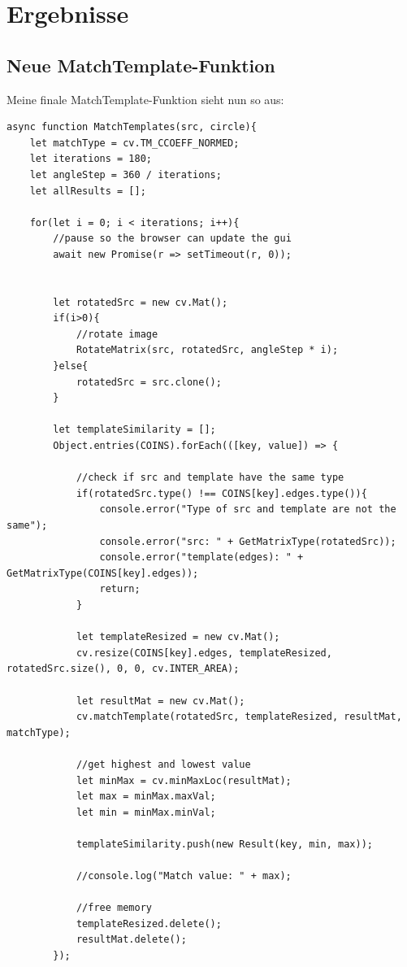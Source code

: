 \section{Ergebnisse}

\subsection{Neue MatchTemplate-Funktion}
Meine finale MatchTemplate-Funktion sieht nun so aus:

\begin{lstlisting}[style=JavaScript]
async function MatchTemplates(src, circle){
    let matchType = cv.TM_CCOEFF_NORMED;
    let iterations = 180;
    let angleStep = 360 / iterations;
    let allResults = [];

    for(let i = 0; i < iterations; i++){
        //pause so the browser can update the gui
        await new Promise(r => setTimeout(r, 0));


        let rotatedSrc = new cv.Mat();
        if(i>0){
            //rotate image
            RotateMatrix(src, rotatedSrc, angleStep * i);
        }else{
            rotatedSrc = src.clone();
        }

        let templateSimilarity = [];
        Object.entries(COINS).forEach(([key, value]) => {

            //check if src and template have the same type
            if(rotatedSrc.type() !== COINS[key].edges.type()){
                console.error("Type of src and template are not the same");
                console.error("src: " + GetMatrixType(rotatedSrc));
                console.error("template(edges): " + GetMatrixType(COINS[key].edges));
                return;
            }

            let templateResized = new cv.Mat();
            cv.resize(COINS[key].edges, templateResized, rotatedSrc.size(), 0, 0, cv.INTER_AREA);

            let resultMat = new cv.Mat();
            cv.matchTemplate(rotatedSrc, templateResized, resultMat, matchType);

            //get highest and lowest value
            let minMax = cv.minMaxLoc(resultMat);
            let max = minMax.maxVal;
            let min = minMax.minVal;

            templateSimilarity.push(new Result(key, min, max));

            //console.log("Match value: " + max);

            //free memory
            templateResized.delete();
            resultMat.delete();
        });


\end{lstlisting}
